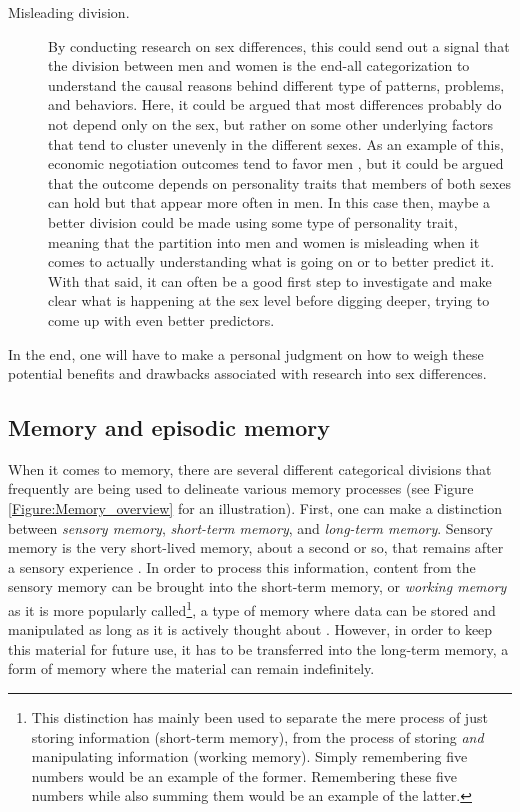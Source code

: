 \begin{description}
\item [Misleading division.] By conducting research on sex differences, this could send out a signal that the division between men and women is the end-all categorization to understand the causal reasons behind different type of patterns, problems, and behaviors. Here, it could be argued that most differences probably do not depend only on the sex, but rather on some other underlying factors that tend to cluster unevenly in the different sexes. As an example of this, economic negotiation outcomes tend to favor men \parencite{Mazei2015}, but it could be argued that the outcome depends on personality traits that members of both sexes can hold but that appear more often in men. In this case then, maybe a better division could be made using some type of personality trait, meaning that the partition into men and women is misleading when it comes to actually understanding what is going on or to better predict it. With that said, it can often be a good first step to investigate and make clear what is happening at the sex level before digging deeper, trying to come up with even better predictors. \end{description}

In the end, one will have to make a personal judgment on how to weigh these potential benefits and drawbacks associated with research into sex differences.

\subsection{Memory and episodic memory} \label{Definition_of_episodic_memory}

When it comes to memory, there are several different categorical divisions that frequently are being used to delineate various memory processes (see Figure \ref{Figure:Memory_overview} for an illustration). First, one can make a distinction between \emph{sensory memory}, \emph{short-term memory}, and \emph{long-term memory}. Sensory memory is the very short-lived memory, about a second or so, that remains after a sensory experience \parencite{Atkinson1968, Sperling1960}. In order to process this information, content from the sensory memory can be brought into the short-term memory, or \emph{working memory} as it is more popularly called\footnote{This distinction has mainly been used to separate the mere process of just storing information (short-term memory), from the process of storing \emph{and} manipulating information (working memory). Simply remembering five numbers would be an example of the former. Remembering these five numbers while also summing them would be an example of the latter.}, a type of memory where data can be stored and manipulated as long as it is actively thought about \parencite{Baddeley2018}. However, in order to keep this material for future use, it has to be transferred into the long-term memory, a form of memory where the material can remain indefinitely.

